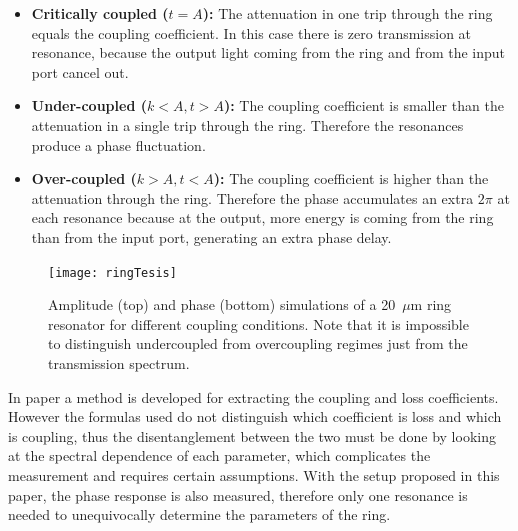 \documentclass[journal]{IEEEtran}
\begin{document}
\begin{itemize}
 \item \textbf{Critically coupled ($t=A$):} The attenuation in one trip through the ring equals the coupling coefficient. In this case there is zero transmission at resonance, because the output light coming from the ring and from the input port cancel out.
 
 \item \textbf{Under-coupled ($k<A,t>A$):}  The coupling coefficient is smaller than the attenuation in a single trip through the ring. Therefore the resonances produce a phase fluctuation.
 
 \item \textbf{Over-coupled ($k>A,t<A$):} The coupling coefficient is higher than the attenuation through the ring. Therefore the phase accumulates an extra $2\pi$ at each resonance because at the output, more energy is coming from the ring than from the input port, generating an extra phase delay.
\end{itemize}



\begin{figure}[htb]
    \centering
    \texttt{[image: ringTesis]}
    \caption{Amplitude (top) and phase (bottom) simulations of a 20~$\mu$m ring resonator for different coupling conditions. Note that it is impossible to distinguish undercoupled from overcoupling regimes just from the transmission spectrum.}
    \label{fig:ringDifferentCoupling}
\end{figure}

In paper \cite{McKinnon2009} a method is developed for extracting the coupling and loss coefficients. However the formulas used do not distinguish which coefficient is loss and which is coupling, thus the disentanglement between the two must be done by looking at the spectral dependence of each parameter, which complicates the measurement and requires certain assumptions. With the setup proposed in this paper, the phase response is also measured, therefore only one resonance is needed to unequivocally determine the parameters of the ring. 
\end{document}

